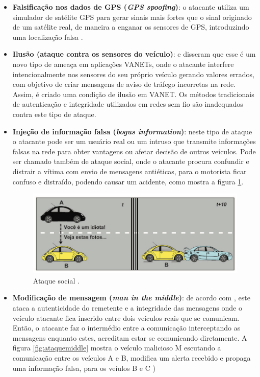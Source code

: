 \documentclass[
	12pt,				%
	oneside,			%
	a4paper,			%
	english,			%
	brazil				%
	]{abntex2ppgsi}
\begin{document}
\begin{itemize}
	\item {\textbf{Falsificação nos dados de GPS (\textit{GPS spoofing})}: o atacante utiliza um simulador de satélite GPS para gerar sinais  mais fortes que o sinal originado de um satélite real, de maneira a enganar os sensores de GPS, introduzindo uma localização falsa \cite{rawat2012vanet}.}
	
	\item {\textbf{Ilusão (ataque contra os sensores do veículo)}:  e  disseram que esse é um novo tipo de ameaça em aplicações VANETs, onde o atacante interfere intencionalmente  nos sensores do seu próprio veículo gerando valores errados, com objetivo de criar mensagens de aviso de tráfego incorretas na rede. Assim, é criado uma condição de ilusão em VANET. Os métodos tradicionais de autenticação e integridade utilizados em redes sem fio são inadequados contra este tipo de ataque.}
	
	\item {\textbf{Injeção de informação falsa (\textit{bogus information})}: neste tipo de ataque o atacante pode ser um usuário real ou um intruso que transmite informações falsas na rede para obter vantagens  ou afetar decisão de outros veículos. Pode ser chamado também de ataque social, onde o atacante  procura confundir e distrair a vítima com envio de mensagens antiéticas, para o motorista ficar confuso e distraído, podendo causar um acidente, como mostra a figura  \ref{fig:ataquesocial}.	}
	
\begin{figure}[h!]
	\centering
	\includegraphics [width=12cm] {images/ataquesocial.png}
	\caption{Ataque social \cite{wanghamsegurancca}.}
	\label{fig:ataquesocial}
\end{figure}	

	\item {\textbf{Modificação de mensagem (\textit{man in the middle})}: de acordo com , este ataca a autenticidade do remetente e a integridade das mensagens onde o veículo atacante fica inserido entre dois veículos reais que se comunicam. Então, o atacante faz o intermédio entre a comunicação interceptando as mensagens enquanto estes, acreditam estar se comunicando diretamente.  A figura \ref{fig:ataquemiddle}  mostra o veículo malicioso M escutando a comunicação entre os veículos A e B, modifica um alerta recebido e propaga uma informação falsa, para os veíulos B e C ) 	}


\end{itemize}
\end{document}
